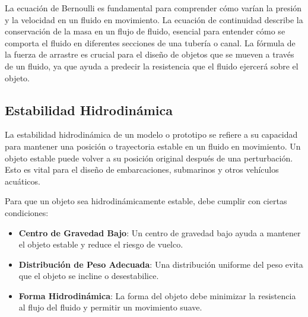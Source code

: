 \documentclass[../main]{subfiles}
\begin{document}


La ecuación de Bernoulli es fundamental para comprender cómo varían la presión y la velocidad en un fluido en movimiento. La ecuación de continuidad describe la conservación de la masa en un flujo de fluido, esencial para entender cómo se comporta el fluido en diferentes secciones de una tubería o canal. La fórmula de la fuerza de arrastre es crucial para el diseño de objetos que se mueven a través de un fluido, ya que ayuda a predecir la resistencia que el fluido ejercerá sobre el objeto.

\subsection{Estabilidad Hidrodinámica}

La estabilidad hidrodinámica de un modelo o prototipo se refiere a su capacidad para mantener una posición o trayectoria estable en un fluido en movimiento. Un objeto estable puede volver a su posición original después de una perturbación. Esto es vital para el diseño de embarcaciones, submarinos y otros vehículos acuáticos.

Para que un objeto sea hidrodinámicamente estable, debe cumplir con ciertas condiciones:
\begin{itemize}
    \item \textbf{Centro de Gravedad Bajo}: Un centro de gravedad bajo ayuda a mantener el objeto estable y reduce el riesgo de vuelco.
    \item \textbf{Distribución de Peso Adecuada}: Una distribución uniforme del peso evita que el objeto se incline o desestabilice.
    \item \textbf{Forma Hidrodinámica}: La forma del objeto debe minimizar la resistencia al flujo del fluido y permitir un movimiento suave.
\end{itemize}
\end{document}
